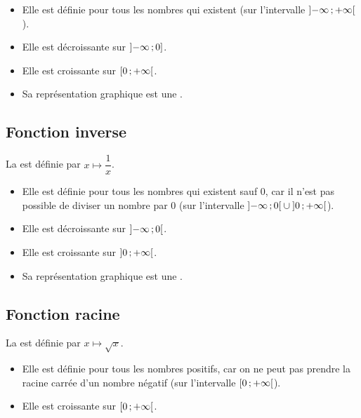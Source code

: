 \documentclass[12pt,a4paper]{article}
\begin{document}
\begin{myprops}
	\begin{itemize}
		\item Elle est définie pour tous les nombres qui existent (sur l'intervalle $\mbox{\ensuremath{\left]- \infty \mathpunct{};+ \infty\right[}}$).
		\item Elle est décroissante sur $\mbox{\ensuremath{\left]- \infty\mathpunct{};0\right]}}$.
		\item Elle est croissante sur $\mbox{\ensuremath{\left[0\mathpunct{};+ \infty\right[}}$.
		\item Sa représentation graphique est une .
	\end{itemize}
	
\end{myprops}




\subsection{Fonction inverse}

\begin{mydef}
	La  est définie par $x \mapsto \dfrac{1}{x}$.			
\end{mydef}

\begin{myprops}
	\begin{itemize}
		\item Elle est définie pour tous les nombres qui existent sauf 0, car il n'est pas possible de diviser un nombre par 0 (sur l'intervalle $\mbox{\ensuremath{\left]-\infty\mathpunct{};0\right[}} \cup \mbox{\ensuremath{\left]0\mathpunct{};+\infty\right[}}$).
		\item Elle est décroissante sur $\mbox{\ensuremath{\left]- \infty\mathpunct{};0\right[}}$.
		\item Elle est croissante sur $\mbox{\ensuremath{\left]0\mathpunct{};+ \infty\right[}}$. 
		\item Sa représentation graphique est une .
	\end{itemize}
\end{myprops}


\subsection{Fonction racine}

\begin{mydef}
	La  est définie par $x \mapsto \sqrt{x}$.			
\end{mydef}

\begin{myprops}
	\begin{itemize}
		\item Elle est définie pour tous les nombres positifs, car on ne peut pas prendre la racine carrée d'un nombre négatif (sur l'intervalle $\mbox{\ensuremath{\left[0\mathpunct{};+\infty\right[}}$).
		\item Elle est croissante sur $\mbox{\ensuremath{\left[0\mathpunct{};+ \infty\right[}}$. 
	\end{itemize}
\end{myprops}
\end{document}
